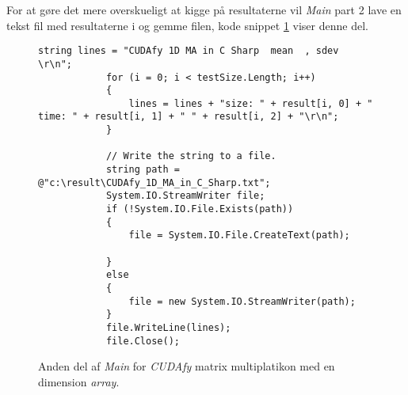 For at gøre det mere overskueligt at kigge på resultaterne vil \textit{Main} part 2 lave en tekst fil med resultaterne i og gemme filen, kode snippet \ref{fig:MainPart2} viser denne del.


\begin{figure}[h]
    \centering
    \lstset{style=sharpc}
	\begin{lstlisting}
string lines = "CUDAfy 1D MA in C Sharp  mean  , sdev \r\n";
            for (i = 0; i < testSize.Length; i++)
            {
                lines = lines + "size: " + result[i, 0] + " time: " + result[i, 1] + " " + result[i, 2] + "\r\n";
            }

            // Write the string to a file.
            string path = @"c:\result\CUDAfy_1D_MA_in_C_Sharp.txt";
            System.IO.StreamWriter file;
            if (!System.IO.File.Exists(path))
            {
                file = System.IO.File.CreateText(path);

            }
            else
            {
                file = new System.IO.StreamWriter(path);
            }
            file.WriteLine(lines);
            file.Close();
	\end{lstlisting}
    \caption{Anden del af \textit{Main} for \textit{CUDAfy} matrix multiplatikon med en dimension \textit{array}.}
    \label{fig:MainPart2}
\end{figure}
































